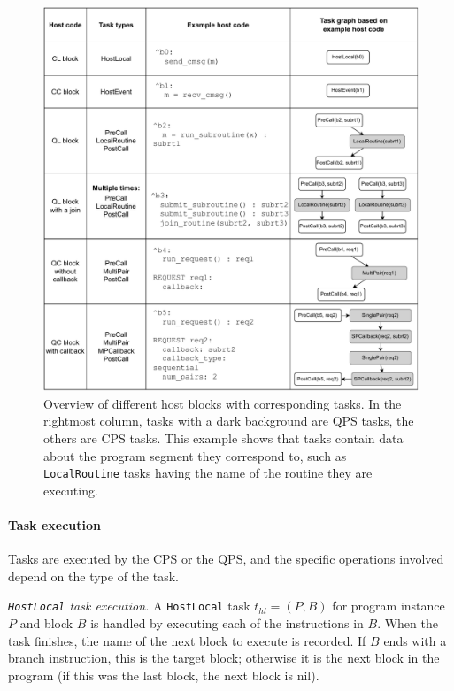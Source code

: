 \begin{figure}
    \centering
    \includegraphics[width=1.0\textwidth]{figures/qoala/task_creation.pdf}
    \caption{Overview of different host blocks with corresponding tasks. In the rightmost column, tasks with a dark background are QPS tasks, the others are CPS tasks. This example shows that tasks contain data about the program segment they correspond to, such as \texttt{LocalRoutine} tasks having the name of the routine they are executing.}
    \label{qoala:fig:app:task_creation}
\end{figure}


\paragraph{Task execution}
Tasks are executed by the CPS or the QPS, and the specific operations involved depend on the type of the task.

\textit{\texttt{HostLocal} task execution.} A \texttt{HostLocal} task $t_{hl} = (P, B)$ for program instance $P$ and block $B$ is handled by executing each of the instructions in $B$. When the task finishes, the name of the next block to execute is recorded. If $B$ ends with a branch instruction, this is the target block; otherwise it is the next block in the program (if this was the last block, the next block is nil).

